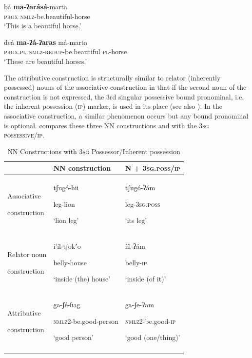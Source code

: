\documentclass[output=paper]{langsci/langscibook}
\begin{document}
\ea\label{ex:ahlandc:51}
\ea\label{ex:ahlandc:51a}
\gll
bá \textbf{ma-ʔarásá}{}-marta \\
\textsc{prox}  \textsc{nmlz}-be.beautiful-horse\\
\glt
‘This is a beautiful horse.’

\ex\label{ex:ahlandc:51b}
\gll
deá          \textbf{ma-ʔá-ʔaras}  má-marta \\
  \textsc{prox.pl}   \textsc{nmlz-redup}{}-be.beautiful  \textsc{pl}{}-horse \\
  \glt
‘These are beautiful horses.’
\z 
\z 

The attributive construction is structurally similar to relator (inherently possessed) nouns of the associative construction in that if the second noun of the construction is not expressed, the 3rd singular possessive bound pronominal, i.e. the inherent possession (\textsc{ip}) marker, is used in its place (see also ). In the associative construction, a similar phenomenon occurs but any bound pronominal is optional.  compares these three NN constructions and with the 3\textsc{sg possessive/ip.}


\begin{table}

\begin{tabularx}{\textwidth}{XXX} 
\lsptoprule
& NN construction & \scshape N + 3sg.poss/ip\\
\midrule

Associative

construction & {tʃug\'{o}-hii} 

leg-lion

‘lion leg’ & {tʃug\'{o}-ʔám} 

leg-\textsc{3sg.poss}

‘its leg’\\
Relator noun 

construction & {i\'{ }íl-tʃokʼo}

belly-house

\mdseries ‘inside (the) house’ & {ííl-ʔám}

belly-\textsc{ip}

\mdseries ‘inside (of it)’\\
Attributive
 
construction & {ga-ʃé-ɓag  }

\textsc{nmlz2-}be.good-person

‘good person’ & {ga{}-ʃe-ʔam}

\textsc{nmlz2-}be.good-\textsc{ip}

‘good (one/thing)’\\
\lspbottomrule
\end{tabularx}
\caption{NN Constructions with \textsc{3sg }Possessor/Inherent possession}
\label{tab:ahlandc:9}
\end{table}
\end{document}
